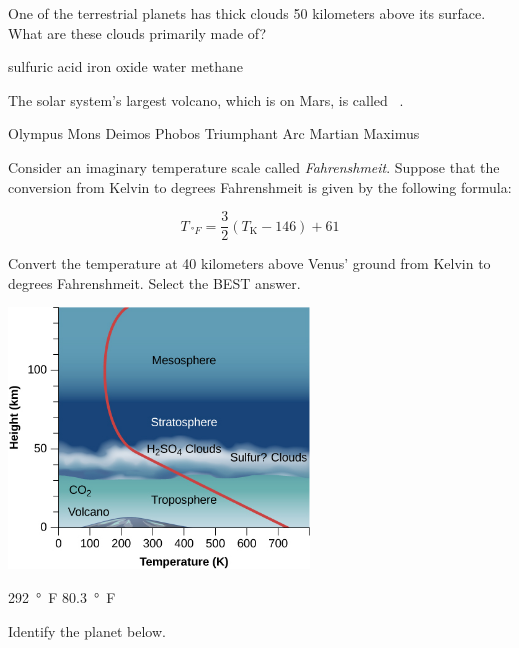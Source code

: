 \documentclass{exam}
\begin{document}
\begin{questions}
\question
One of the terrestrial planets has thick clouds 50 kilometers above its surface. What are these clouds primarily made of?

\begin{randomizechoices}
    \correctchoice sulfuric acid
    \choice iron oxide
    \choice water
    \choice methane
\end{randomizechoices}

\question
The solar system's largest volcano, which is on Mars, is called \fillin\ .

\begin{randomizechoices}
    \correctchoice Olympus Mons
    \choice Deimos
    \choice Phobos
    \choice Triumphant Arc
    \choice Martian Maximus
\end{randomizechoices}

\question
Consider an imaginary temperature scale called \textit{Fahrenshmeit}. Suppose that the conversion from Kelvin to degrees Fahrenshmeit is given by the following formula:

\begin{equation*}
    T_{\SI{}{\degree F}} = \frac{3}{2} \left(T_{\text{K}} - 146\right) + 61
\end{equation*}

Convert the temperature at 40 kilometers above Venus' ground from Kelvin to degrees Fahrenshmeit. Select the BEST answer.

\begin{center}
    \includegraphics[width=8cm]{Figures/Figure10.12.jpeg}
\end{center}

\begin{randomizechoices}
    \correctchoice \SI{292}{\degree F}
    \choice \SI{80.3}{\degree F}
\end{randomizechoices}

\question
Identify the planet below.


\end{questions}
\end{document}
